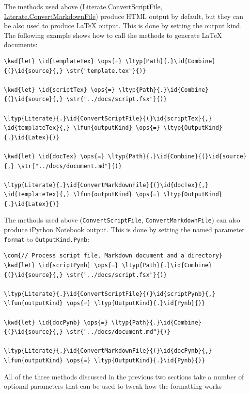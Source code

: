 \documentclass{article}
\newcommand{\id}[1]{\textcolor{black}{#1}}
\newcommand{\com}[1]{\textcolor{officegreen}{#1}}
\newcommand{\kwd}[1]{\textcolor{navy}{#1}}
\newcommand{\ops}[1]{\textcolor{purple}{#1}}
\newcommand{\str}[1]{\textcolor{olive}{#1}}
\begin{document}
The methods used above (\href{https://fsprojects.github.io/FSharp.Formatting/reference/fsharp-formatting-literate-literate.html}{Literate.ConvertScriptFile}, \href{https://fsprojects.github.io/FSharp.Formatting/reference/fsharp-formatting-literate-literate.html}{Literate.ConvertMarkdownFile})
produce HTML output by default, but they can be also used to produce LaTeX output. This is done
by setting the output kind. The following
example shows how to call the methods to generate LaTeX documents:
\begin{Verbatim}[commandchars=\\\{\}]
\kwd{let} \id{templateTex} \ops{=} \ltyp{Path}{.}\id{Combine}{(}\id{source}{,} \str{"template.tex"}{)}

\kwd{let} \id{scriptTex} \ops{=} \ltyp{Path}{.}\id{Combine}{(}\id{source}{,} \str{"../docs/script.fsx"}{)}

\ltyp{Literate}{.}\id{ConvertScriptFile}{(}\id{scriptTex}{,} \id{templateTex}{,} \lfun{outputKind} \ops{=} \ltyp{OutputKind}{.}\id{Latex}{)}

\kwd{let} \id{docTex} \ops{=} \ltyp{Path}{.}\id{Combine}{(}\id{source}{,} \str{"../docs/document.md"}{)}

\ltyp{Literate}{.}\id{ConvertMarkdownFile}{(}\id{docTex}{,} \id{templateTex}{,} \lfun{outputKind} \ops{=} \ltyp{OutputKind}{.}\id{Latex}{)}
\end{Verbatim}



The methods used above (\texttt{ConvertScriptFile}, \texttt{ConvertMarkdownFile})
can also produce iPython Notebook output. This is done
by setting the named parameter \texttt{format} to \texttt{OutputKind.Pynb}:
\begin{Verbatim}[commandchars=\\\{\}]
\com{// Process script file, Markdown document and a directory}
\kwd{let} \id{scriptPynb} \ops{=} \ltyp{Path}{.}\id{Combine}{(}\id{source}{,} \str{"../docs/script.fsx"}{)}

\ltyp{Literate}{.}\id{ConvertScriptFile}{(}\id{scriptPynb}{,} \lfun{outputKind} \ops{=} \ltyp{OutputKind}{.}\id{Pynb}{)}

\kwd{let} \id{docPynb} \ops{=} \ltyp{Path}{.}\id{Combine}{(}\id{source}{,} \str{"../docs/document.md"}{)}

\ltyp{Literate}{.}\id{ConvertMarkdownFile}{(}\id{docPynb}{,} \lfun{outputKind} \ops{=} \ltyp{OutputKind}{.}\id{Pynb}{)}
\end{Verbatim}



All of the three methods discussed in the previous two sections take a number of optional
parameters that can be used to tweak how the formatting works
\end{document}
